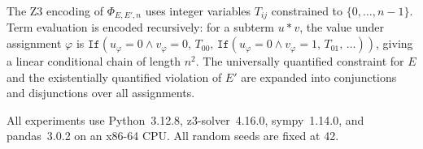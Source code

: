 The Z3 encoding of $\Phi_{E,E',n}$ uses integer variables $T_{ij}$ constrained
to $\{0,\ldots,n-1\}$.  Term evaluation is encoded recursively: for a subterm
$u * v$, the value under assignment $\varphi$ is
$\mathtt{If}(u_\varphi = 0 \wedge v_\varphi = 0,\, T_{00},\,
   \mathtt{If}(u_\varphi = 0 \wedge v_\varphi = 1,\, T_{01},\, \ldots))$,
giving a linear conditional chain of length $n^2$.  The universally quantified
constraint for $E$ and the existentially quantified violation of $E'$ are expanded
into conjunctions and disjunctions over all assignments.

All experiments use Python~3.12.8, z3-solver~4.16.0, sympy~1.14.0, and
pandas~3.0.2 on an x86-64 CPU.  All random seeds are fixed at 42.
